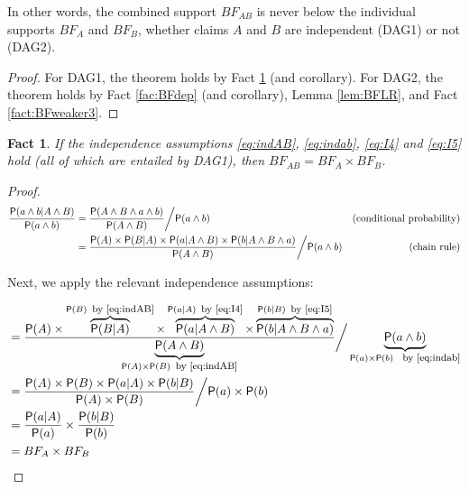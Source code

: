 \documentclass[
  10pt,
  dvipsnames,enabledeprecatedfontcommands]{scrartcl}
\newtheorem{fact}{Fact}
\newcommand{\et}{\wedge}
\newcommand{\pr}[1]{\ensuremath{\mathsf{P}(#1)}}
\begin{document}
\noindent In other words, the combined support \(BF_{AB}\) is never
below the individual supports \(BF_A\) and \(BF_B\), whether claims
\(A\) and \(B\) are independent (\textsf{DAG1}) or not (\textsf{DAG2}).

\begin{proof}
For \textsf{DAG1}, the theorem holds by Fact \ref{fac:BFindep} (and corollary). For 
\textsf{DAG2}, the theorem holds by Fact \ref{fac:BFdep} (and corollary), Lemma \ref{lem:BFLR}, and Fact \ref{fact:BFweaker3}. 
\end{proof}

\begin{fact} If the independence assumptions \eqref{eq:indAB}, \eqref{eq:indab}, \eqref{eq:I4} and \eqref{eq:I5} hold (all of which are entailed by \textsf{DAG1}), then 
$BF_{AB} = BF_A \times BF_B$. \label{fac:BFindep}
\end{fact}

\begin{proof}

\begin{align*}
\frac{\pr{a \wedge b\vert A\wedge B}}{\pr{a \wedge b}} & = \frac{\pr{A \et B\et a\wedge b}}{\pr{A \et B}} \bigg/ \pr{a \wedge b}
&\mbox{(conditional probability)} \\
&  = \frac{\pr{A} \times \pr {B \vert A}  \times \pr{a \vert A \et B} \times \pr{b \vert A \et B \et a}}{\pr{A \et B}} \bigg/ \pr{a \wedge b}
&\mbox{\,\,\,\,\,\,\, (chain rule)} \\
\end{align*}

\noindent Next, we apply the relevant independence assumptions:

\begin{align*}
&  = \frac{\pr{A} \times \overbrace{\pr {B \vert A}}^{ \pr{B} \mbox{\footnotesize \, by \eqref{eq:indAB}}}  \times
\overbrace{\pr{a \vert A \et B}}^{\pr{a \vert A} \mbox{\footnotesize \, by \eqref{eq:I4}}}
\times \overbrace{\pr{b \vert A \et B \et a}}^{\pr{b \vert B} \mbox{\footnotesize \, by \eqref{eq:I5}}}
}{\underbrace{\pr{A \et B}}_{\pr{A} \times \pr{B} \mbox{\footnotesize \, by \eqref{eq:indAB}}}} \bigg/ \underbrace{\pr{a \wedge b}}_{\pr{a}\times \pr{b} \mbox{ \footnotesize \, by \eqref{eq:indab}}} \\
&  = \frac{\pr{A} \times  \pr{B}   \times \pr{a \vert A}  \times  \pr{b \vert B}}
{\pr{A} \times \pr{B}} \bigg/ \pr{a}\times \pr{b} \\
& = \frac{\pr{a \vert A}  }{\pr{a}}  \times \frac{\pr{b \vert B}}{\pr{b}} \\
& = BF_{A} \times BF_B
\end{align*}

\end{proof}
\end{document}

